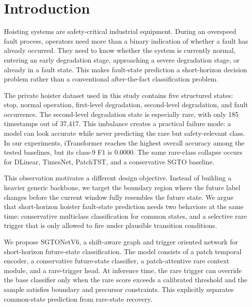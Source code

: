 \section{Introduction}
\label{sec:introduction}

Hoisting systems are safety-critical industrial equipment. During an overspeed fault process, operators need more than a binary indication of whether a fault has already occurred. They need to know whether the system is currently normal, entering an early degradation stage, approaching a severe degradation stage, or already in a fault state. This makes fault-state prediction a short-horizon decision problem rather than a conventional after-the-fact classification problem.

The private hoister dataset used in this study contains five structured states: stop, normal operation, first-level degradation, second-level degradation, and fault occurrence. The second-level degradation state is especially rare, with only 185 timestamps out of 37,417. This imbalance creates a practical failure mode: a model can look accurate while never predicting the rare but safety-relevant class. In our experiments, iTransformer reaches the highest overall accuracy among the tested baselines, but its class-9 F1 is 0.0000. The same rare-class collapse occurs for DLinear, TimesNet, PatchTST, and a conservative SGTO baseline.

This observation motivates a different design objective. Instead of building a heavier generic backbone, we target the boundary region where the future label changes before the current window fully resembles the future state. We argue that short-horizon hoister fault-state prediction needs two behaviors at the same time: conservative multiclass classification for common states, and a selective rare trigger that is only allowed to fire under plausible transition conditions.

We propose SGTONetV6, a shift-aware graph and trigger oriented network for short-horizon future-state classification. The model consists of a patch temporal encoder, a conservative future-state classifier, a patch-attentive rare context module, and a rare-trigger head. At inference time, the rare trigger can override the base classifier only when the rare score exceeds a calibrated threshold and the sample satisfies boundary and precursor constraints. This explicitly separates common-state prediction from rare-state recovery.


